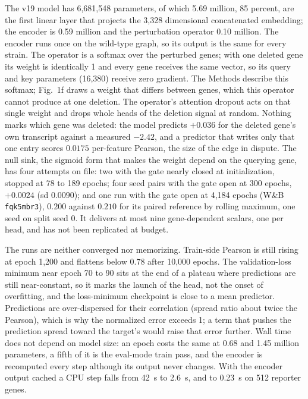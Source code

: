  The v19 model has 6{,}681{,}548 parameters, of
which 5.69 million, 85 percent, are the first linear layer that projects the 3{,}328
dimensional concatenated embedding; the encoder is 0.59 million and the perturbation
operator 0.10 million. The encoder runs once on the wild-type graph, so its output is the
same for every strain. The operator is a softmax over the perturbed genes; with one deleted
gene its weight is identically 1 and every gene receives the same vector, so its query and
key parameters (16{,}380) receive zero gradient. The Methods describe this softmax; Fig.~1f
draws a weight that differs between genes, which this operator cannot produce at one
deletion. The operator's attention dropout acts on that single weight and drops whole heads
of the deletion signal at random. Nothing marks which gene was deleted: the model predicts
$+0.036$ for the deleted gene's own transcript against a measured $-2.42$, and a predictor
that writes only that one entry scores $0.0175$ per-feature Pearson, the size of the edge in
dispute. The null sink, the sigmoid form that makes the weight depend on the querying gene,
has four attempts on file: two with the gate nearly closed at initialization, stopped at 78
to 189 epochs; four seed pairs with the gate open at 300 epochs, $+0.0024$ (sd $0.0090$);
and one run with the gate open at 4{,}184 epochs (W\&B \texttt{fqk5mbr3}), $0.200$ against
$0.210$ for its paired reference by rolling maximum, one seed on split seed 0. It delivers
at most nine gene-dependent scalars, one per head, and has not been replicated at budget.

 The runs are neither converged nor memorizing.
Train-side Pearson is still rising at epoch 1{,}200 and flattens below $0.78$ after 10{,}000
epochs. The validation-loss minimum near epoch 70 to 90 sits at the end of a plateau where
predictions are still near-constant, so it marks the launch of the head, not the onset of
overfitting, and the loss-minimum checkpoint is close to a mean predictor. Predictions are
over-dispersed for their correlation (spread ratio about twice the Pearson), which is why
the normalized error exceeds 1; a term that pushes the prediction spread toward the target's
would raise that error further. Wall time does not depend on model size: an epoch costs the
same at 0.68 and 1.45 million parameters, a fifth of it is the eval-mode train pass, and
the encoder is recomputed every step although its output never changes. With the encoder
output cached a CPU step falls from 42~s to 2.6~s, and to 0.23~s on 512 reporter genes.


